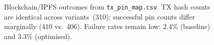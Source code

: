 \documentclass{article}
\begin{document}
\begin{figure}[htbp]
\caption{Blockchain/IPFS outcomes from \texttt{tx\_pin\_map.csv}. TX hash counts are identical across variants~(310); successful pin counts differ marginally (410 vs.\ 406). Failure rates remain low: 2.4\% (baseline) and 3.3\% (optimised).}
\label{fig:txpin_raw}
\end{figure}
\end{document}
